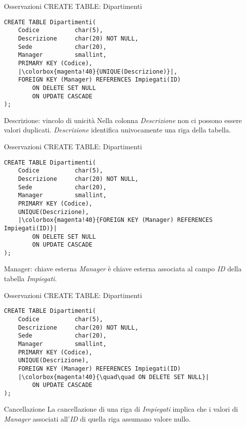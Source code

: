 %
\begin{frame}[fragile]{Osservazioni CREATE TABLE: Dipartimenti}
\vspace{-.6cm}
\begin{lstlisting}
CREATE TABLE Dipartimenti(
    Codice          char(5),
    Descrizione     char(20) NOT NULL,
    Sede            char(20),
    Manager         smallint,
    PRIMARY KEY (Codice),
    |\colorbox{magenta!40}{UNIQUE(Descrizione)}|,
    FOREIGN KEY (Manager) REFERENCES Impiegati(ID)
        ON DELETE SET NULL
        ON UPDATE CASCADE
);    
\end{lstlisting}
\begin{block}{Descrizione: vincolo di unicit\`a}
    Nella colonna \textit{Descrizione} non ci possono essere valori duplicati. \textit{Descrizione} identifica univocamente una riga della tabella.
\end{block}
\end{frame}
%
\begin{frame}[fragile]{Osservazioni CREATE TABLE: Dipartimenti}
\vspace{-.6cm}
\begin{lstlisting}
CREATE TABLE Dipartimenti(
    Codice          char(5),
    Descrizione     char(20) NOT NULL,
    Sede            char(20),
    Manager         smallint,
    PRIMARY KEY (Codice),
    UNIQUE(Descrizione),
    |\colorbox{magenta!40}{FOREIGN KEY (Manager) REFERENCES Impiegati(ID)}|
        ON DELETE SET NULL
        ON UPDATE CASCADE
);    
\end{lstlisting}
\begin{block}{Manager: chiave esterna}
    \textit{Manager} \`e chiave esterna associata al campo \textit{ID} della tabella \textit{Impiegati}.
\end{block}
\end{frame}
%
\begin{frame}[fragile]{Osservazioni CREATE TABLE: Dipartimenti}
\vspace{-.6cm}
\begin{lstlisting}
CREATE TABLE Dipartimenti(
    Codice          char(5),
    Descrizione     char(20) NOT NULL,
    Sede            char(20),
    Manager         smallint,
    PRIMARY KEY (Codice),
    UNIQUE(Descrizione),
    FOREIGN KEY (Manager) REFERENCES Impiegati(ID)
    |\colorbox{magenta!40}{\quad\quad ON DELETE SET NULL}|
        ON UPDATE CASCADE
);    
\end{lstlisting}
\begin{block}{Cancellazione}
    La cancellazione di una riga di \textit{Impiegati} implica che i valori di \textit{Manager} associati all'\textit{ID} di quella riga assumano valore nullo.
\end{block}
\end{frame}
